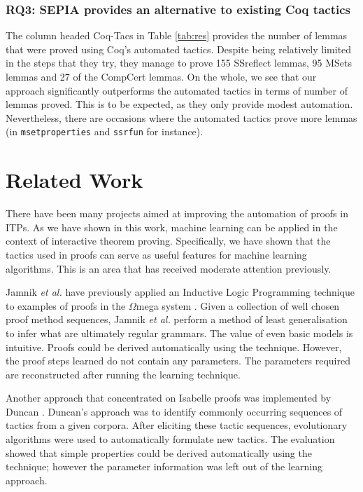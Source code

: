 \documentclass{llncs}
\begin{document}
\vspace{-3mm}

\subsubsection{RQ3: SEPIA provides an alternative to existing Coq tactics}
The column headed Coq-Tacs in Table \ref{tab:res} provides the number of lemmas that were proved using Coq's automated tactics. Despite being relatively limited in the steps that they try, they manage to prove 155 SSreflect lemmas, 95 MSets lemmas and 27 of the CompCert lemmas. On the whole, we see that our approach significantly outperforms the automated tactics in terms of number of lemmas proved. This is to be expected, as they only provide modest automation. Nevertheless, there are occasions where the automated tactics prove more lemmas (in \texttt{msetproperties} and \texttt{ssrfun} for instance). 

\section{Related Work}
\label{sec:related}
There have been many projects aimed at improving the automation of proofs in ITPs. As we have shown in this work, machine learning can be applied in the context of interactive theorem proving. Specifically, we have shown that the tactics used in proofs can serve as useful features for machine learning algorithms. This is an area that has received moderate attention previously.

Jamnik \emph{et al.} have previously applied an Inductive Logic Programming technique to examples of proofs in the $\Omega$mega system \cite{Jamnik03}. Given a collection of well chosen proof method sequences, Jamnik \emph{et al.} perform a method of least generalisation to infer what are ultimately regular grammars. The value of even basic models is intuitive. Proofs could be derived automatically using the technique. However, the proof steps learned do not contain any parameters. The parameters required are reconstructed after running the learning technique.

Another approach that concentrated on Isabelle proofs was implemented by Duncan \cite{Duncan07}. Duncan's approach was to identify commonly occurring sequences of tactics from a given corpora. After eliciting these tactic sequences, evolutionary algorithms were used to automatically formulate new tactics. The evaluation showed that simple properties could be derived automatically using the technique; however the parameter information was left out of the learning approach. 
\end{document}

